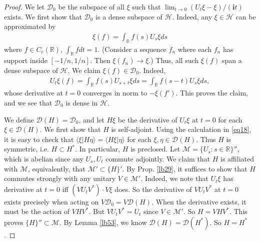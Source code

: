 \documentclass[12pt,a4paper,notitlepage]{article}
\theoremstyle{definition}
\theoremstyle{plain}
\newcommand{\mc}{\mathcal}
\newcommand{\Dom}{\scr D}
\newcommand{\bk}[1]{\langle {#1}\rangle}
\newcommand{\scr}{\mathscr}
\newcommand{\im}{\mathbf{i}}
\newcommand{\Rbb}{\mathbb R}
\numberwithin{equation}{section}
\begin{document}
\begin{proof}
We let $\Dom_0$ be the subspace of all $\xi$ such that $\lim_{t\rightarrow 0}(U_t\xi-\xi)/(\im t)$ exists. We first show that $\Dom_0$ is a dense subspace of $\mc H$. Indeed, any $\xi\in\mc H$ can be approximated by
\begin{align*}
\xi(f)=\int_\Rbb f(s)U_s\xi ds	
\end{align*}
where $f\in C_c(\Rbb)$,  $\int_\Rbb fdt=1$. (Consider a sequence $f_n$ where each $f_n$ has support inside $[-1/n,1/n]$. Then $\xi(f_n)\rightarrow\xi$.) Thus, all such $\xi(f)$ span a dense subspace of $\mc H$. We claim $\xi(f)\in\Dom_0$. Indeed,
\begin{align*}
U_t\xi(f)=\int_\Rbb f(s)U_{s+t}\xi ds=\int_\Rbb f(s-t)U_s\xi ds,	
\end{align*}
whose derivative at $t=0$ converges in norm to $-\xi(f')$. This proves the claim, and we see that $\Dom_0$ is dense in $\mc H$.

We define $\Dom(H)=\Dom_0$, and let $H\xi$ be the derivative of $U_t\xi$ at $t=0$ for each $\xi\in\Dom(H)$. We first show that $H$ is self-adjoint. Using the calculation in \eqref{eq18}, it is easy to check that $\bk{\xi|H\eta}=\bk{H\xi|\eta}$ for each $\xi,\eta\in\Dom(H)$. Thus $H$ is symmetric, i.e. $H\subset H^*$. In particular, $H$ is preclosed. Let $\mc M=\{U_s:s\in\Rbb\}''$, which is abelian since any $U_s,U_t$ commute adjointly. We claim that $H$ is affiliated with $\mc M$, equivalently, that $\mc M'\subset\{H\}'$. By Prop. \ref{lb29}, it suffices to show that $H$ commutes strongly with any unitary $V\in\mc M'$. Indeed, we note that $U_t\xi$ has derivative at $t=0$ iff $(VU_tV^*)\cdot V\xi$ does. So the derivative of $VU_tV^*$ at $t=0$ exists precisely when acting on $V\Dom_0=V\Dom(H)$. When the derivative exists, it must be the action of $VHV^*$. But $VU_tV^*=U_t$ since $V\in\mc M'$. So $H=VHV^*$. This proves $\{H\}''\subset\mc M$. By Lemma \ref{lb53}, we know $\Dom(H)=\Dom(H^*)$. So $H=H^*$.


\end{proof}
\end{document}
